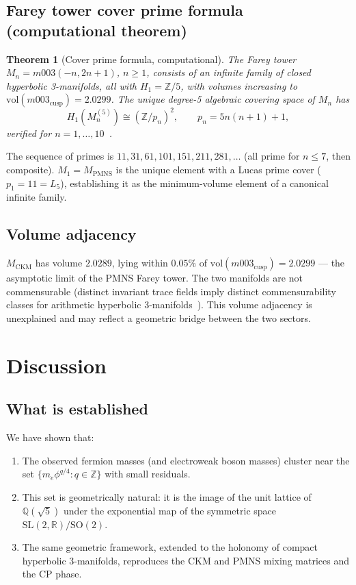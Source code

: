 ﻿\documentclass[12pt]{article}
\newtheorem{theorem}{Theorem}
\theoremstyle{definition}
\begin{document}
\subsection{Farey tower cover prime formula (computational theorem)}
\begin{theorem}[Cover prime formula, computational]
The Farey tower $M_n = m003(-n,2n+1)$, $n\geq1$, consists of an
infinite family of closed hyperbolic 3-manifolds, all with
$H_1=\mathbb{Z}/5$, with volumes increasing to
$\mathrm{vol}(m003_\mathrm{cusp}) = 2.0299$.
The unique degree-5 algebraic covering space of $M_n$ has
\[
  H_1(M_n^{(5)}) \cong (\mathbb{Z}/p_n)^2,
  \qquad p_n = 5n(n+1)+1,
\]
verified for $n=1,\ldots,10$~\cite{Gentry:Lucas}.
\end{theorem}
The sequence of primes is $11, 31, 61, 101, 151, 211, 281, \ldots$
(all prime for $n\leq7$, then composite).
$M_1 = M_\mathrm{PMNS}$ is the unique element with a Lucas prime cover
($p_1 = 11 = L_5$), establishing it as the minimum-volume element
of a canonical infinite family.

\subsection{Volume adjacency}
$M_\mathrm{CKM}$ has volume $2.0289$, lying within $0.05\%$ of
$\mathrm{vol}(m003_\mathrm{cusp}) = 2.0299$ — the asymptotic limit
of the PMNS Farey tower.
The two manifolds are not commensurable (distinct invariant trace
fields imply distinct commensurability classes for arithmetic
hyperbolic 3-manifolds~\cite{MaclachlanReid}).
This volume adjacency is unexplained and may reflect a geometric
bridge between the two sectors.

\section{Discussion}
\label{sec:discussion}

\subsection{What is established}
We have shown that:
\begin{enumerate}
\item The observed fermion masses (and electroweak boson masses) cluster near the set $\{m_e \phi^{q/4} : q\in\mathbb{Z}\}$ with small residuals.
\item This set is geometrically natural: it is the image of the unit lattice of $\mathbb{Q}(\sqrt5)$ under the exponential map of the symmetric space $\mathrm{SL}(2,\mathbb{R})/\mathrm{SO}(2)$.
\item The same geometric framework, extended to the holonomy of compact hyperbolic 3-manifolds, reproduces the CKM and PMNS mixing matrices and the CP phase.
\end{enumerate}
\end{document}
